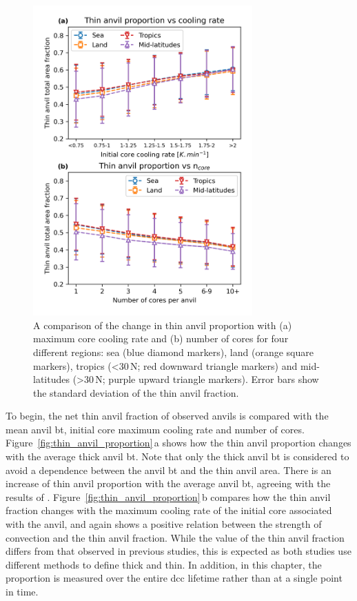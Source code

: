 \begin{figure}[tp]
    \centering
    \includegraphics[width=0.75\textwidth]{figures/chapter3_05.png}
    \caption[
    A comparison of the change in thin anvil proportion with maximum core cooling rate and number of cores for four different regions
    ]{
    A comparison of the change in thin anvil proportion with (a) maximum core cooling rate and (b) number of cores for four different regions: sea (blue diamond markers), land (orange square markers), tropics (\textless 30\,\textdegree N; red downward triangle markers) and mid-latitudes (\textgreater 30\,\textdegree N; purple upward triangle markers). Error bars show the standard deviation of the thin anvil fraction.
    }
    \label{fig:regional_thin_anvil_proportion}
\end{figure}

To begin, the net thin anvil fraction of observed anvils is compared with the mean anvil \acrshort{bt}, initial core maximum cooling rate and number of cores.
Figure~\ref{fig:thin_anvil_proportion}\,a shows how the thin anvil proportion changes with the average thick anvil \acrshort{bt}.
Note that only the thick anvil \acrshort{bt} is considered to avoid a dependence between the anvil \acrshort{bt} and the thin anvil area.
There is an increase of thin anvil proportion with the average anvil \acrshort{bt}, agreeing with the results of \citet{protopapadaki_upper_2017}.
Figure~\ref{fig:thin_anvil_proportion}\,b compares how the thin anvil fraction changes with the maximum cooling rate of the initial core associated with the anvil, and again shows a positive relation between the strength of convection and the thin anvil fraction.
While the value of the thin anvil fraction differs from that observed in previous studies, this is expected as both studies use different methods to define thick and thin.
In addition, in this chapter, the proportion is measured over the entire \acrshort{dcc} lifetime rather than at a single point in time.

